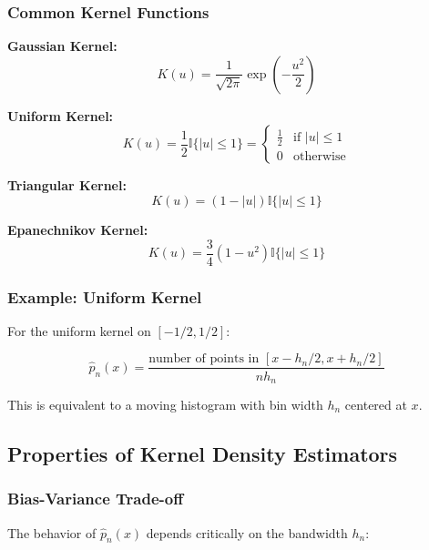 \documentclass[12pt,a4paper]{article}
\begin{document}
\subsubsection{Common Kernel Functions}

\textbf{Gaussian Kernel:}
\begin{equation}
K(u) = \frac{1}{\sqrt{2\pi}} \exp\left(-\frac{u^2}{2}\right)
\end{equation}

\textbf{Uniform Kernel:}
\begin{equation}
K(u) = \frac{1}{2} \mathbb{I}\{|u| \leq 1\} = \begin{cases}
\frac{1}{2} & \text{if } |u| \leq 1 \\
0 & \text{otherwise}
\end{cases}
\end{equation}

\textbf{Triangular Kernel:}
\begin{equation}
K(u) = (1 - |u|) \mathbb{I}\{|u| \leq 1\}
\end{equation}

\textbf{Epanechnikov Kernel:}
\begin{equation}
K(u) = \frac{3}{4}(1 - u^2) \mathbb{I}\{|u| \leq 1\}
\end{equation}

\subsubsection{Example: Uniform Kernel}

For the uniform kernel on $[-1/2, 1/2]$:

\begin{equation}
\hat{p}_n(x) = \frac{\text{number of points in } [x - h_n/2, x + h_n/2]}{nh_n}
\end{equation}

This is equivalent to a moving histogram with bin width $h_n$ centered at $x$.

\subsection{Properties of Kernel Density Estimators}

\subsubsection{Bias-Variance Trade-off}

The behavior of $\hat{p}_n(x)$ depends critically on the bandwidth $h_n$:
\end{document}
